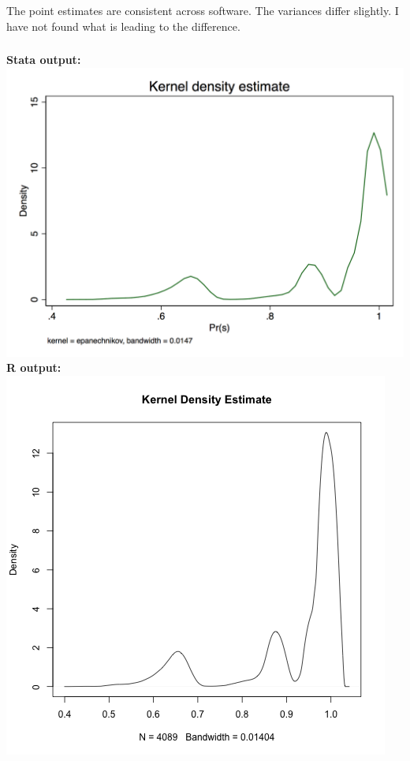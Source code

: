\documentclass[12pt]{article}
\begin{document}
The point estimates are consistent across software. The variances differ slightly. I have not found what is leading to the difference.




\subsubsection{}
\textbf{Stata output:}\\

\includegraphics[totalheight=9cm]{hw3_q1_9a_stata.png}\\
\clearpage
\textbf{R output:}\\

\includegraphics[totalheight=9cm]{hw3_q1_9c_r.png}\\
\end{document}
